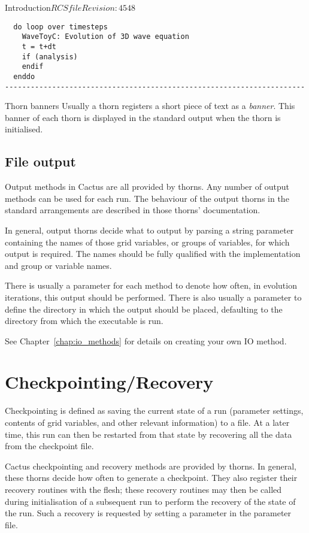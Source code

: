 \begin{cactuspart}{Introduction}{$RCSfile$}{$Revision: 4548 $}
\begin{Lentry}
\begin{verbatim}
  do loop over timesteps
    WaveToyC: Evolution of 3D wave equation
    t = t+dt
    if (analysis)
    endif
  enddo
----------------------------------------------------------------------
\end{verbatim}

\item [Thorn banners]
        Usually a thorn registers a short piece of text as a \emph{banner}.
        This banner of each thorn is displayed in the standard output when
        the thorn is initialised.

\end{Lentry}


\section{File output}
Output methods in Cactus are all provided by thorns.
Any number of output methods can be used for each run.
The behaviour of the output thorns in the
standard arrangements are described in those thorns' documentation.

In general, output thorns decide what to output by parsing a string parameter
containing the names of those grid variables, or groups of variables, for which
output is required. The names should be fully qualified with the
implementation and group or variable names.

There is usually a parameter for each method to denote how often, in evolution
iterations, this output should be performed.  There is also usually a parameter
to define the directory in which the output should be placed, defaulting to the
directory from which the executable is run.

See Chapter~\ref{chap:io_methods} for details on creating your own IO method.



\chapter{Checkpointing/Recovery}
\label{sec:checkpointing}

Checkpointing is defined as saving the current state of a run (parameter
settings, contents of grid variables, and other relevant information) to a file.
At a later time, this run can then be restarted from that state by recovering
all the data from the checkpoint file.

Cactus checkpointing and recovery methods are provided by thorns.
In general, these thorns decide how often to generate a checkpoint.
They also register their recovery routines with the flesh; these recovery
routines may then be called during initialisation of a subsequent run to
perform the recovery of the state of the run.
Such a recovery is requested by setting a parameter in the parameter file.


\end{cactuspart}

